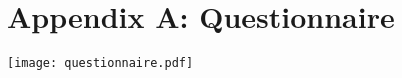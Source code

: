 \section{Appendix A: Questionnaire}
\begin{adjustbox}{width=1\textwidth}
	\texttt{[image: questionnaire.pdf]}
\end{adjustbox}

